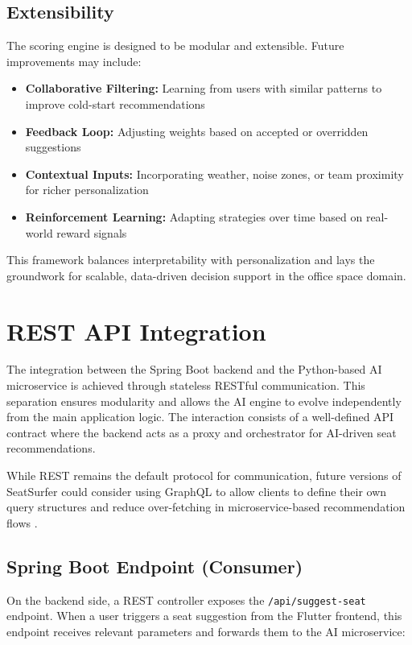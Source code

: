 \documentclass[12pt,a4paper]{report} %
\begin{document}
\subsection*{Extensibility}

The scoring engine is designed to be modular and extensible. Future improvements may include:
\begin{itemize}
\item \textbf{Collaborative Filtering:} Learning from users with similar patterns to improve cold-start recommendations
\item \textbf{Feedback Loop:} Adjusting weights based on accepted or overridden suggestions
\item \textbf{Contextual Inputs:} Incorporating weather, noise zones, or team proximity for richer personalization
\item \textbf{Reinforcement Learning:} Adapting strategies over time based on real-world reward signals
\end{itemize}

This framework balances interpretability with personalization and lays the groundwork for scalable, data-driven decision support in the office space domain.

\section{REST API Integration}

The integration between the Spring Boot backend and the Python-based AI microservice is achieved through stateless RESTful communication. This separation ensures modularity and allows the AI engine to evolve independently from the main application logic. The interaction consists of a well-defined API contract where the backend acts as a proxy and orchestrator for AI-driven seat recommendations.

While REST remains the default protocol for communication, future versions of SeatSurfer could consider using GraphQL to allow clients to define their own query structures and reduce over-fetching in microservice-based recommendation flows \cite{wang2022graphql}.

\subsection*{Spring Boot Endpoint (Consumer)}

On the backend side, a REST controller exposes the \texttt{/api/suggest-seat} endpoint. When a user triggers a seat suggestion from the Flutter frontend, this endpoint receives relevant parameters and forwards them to the AI microservice:
\end{document}
